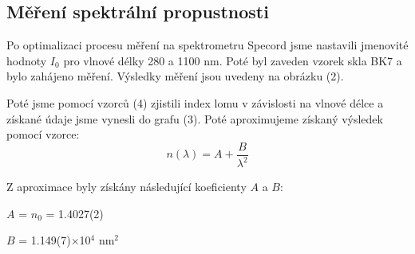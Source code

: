 \documentclass[a4paper,11pt]{article}
\begin{document}
\begin{minipage}[t]{0.5\textwidth}
            \subsection{Měření spektrální propustnosti}  
                \par Po optimalizaci procesu měření na spektrometru Specord jsme nastavili jmenovité hodnoty $I_0$ pro vlnové délky 280 a 1100 nm. Poté byl zaveden vzorek skla BK7 a bylo zahájeno měření. Výsledky měření jsou uvedeny na obrázku (2).
                \par Poté jsme pomocí vzorců (4) zjistili index lomu v závislosti na vlnové délce a získané údaje jsme vynesli do grafu (3). Poté aproximujeme získaný výsledek pomocí vzorce: 
                \begin{equation}
                    n(\lambda) = A + \frac{B}{\lambda^2}
                \end{equation}
                \par Z aproximace byly získány následující koeficienty $A$ a $B$: 
                \begin{center}
                    $A$ = $n_0$ = 1.4027(2)
                    \vspace{5pt}
                    \par $B$ = 1.149(7)$\times$10$^4$ nm$^2$    
                \end{center}
    \end{minipage}
    \hspace{10pt}
\end{document}
